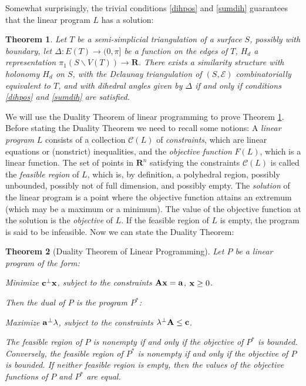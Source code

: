 \documentclass{acmart}
\newcommand{\thm}[2]{\begin{#1} #2 \end{#1}}
\newtheorem{theorem}{Theorem}[section]
\begin{document}
Somewhat surprisingly, the trivial conditions \ref{dihpos} and \ref{sumdih}
guarantees that the linear program $L$ has a solution:

\thm{theorem}
{
\label{mainthm}
Let $T$ be a semi-simplicial triangulation of a surface $S$, possibly
with boundary, let $\Delta:E(T)\rightarrow (0, \pi]$ be a function
on the edges of $T$, $H_d$ a representation $\pi_1 (S \backslash V(T))
\rightarrow \mathbf{R}$. There exists a similarity structure with
holonomy $H_d$ on $S$, with the Delaunay triangulation of $(S,
\mathcal{E})$ combinatorially equivalent to $T$, and with dihedral
angles given by $\Delta$ if and only if conditions \ref{dihpos} and
\ref{sumdih} are satisfied.
}

We will use the Duality Theorem of linear programming to prove Theorem
\ref{mainthm}. Before stating the Duality Theorem we need to recall
some notions: A \emph{linear program} $L$ consists of a collection
$\mathcal{C}(L)$ of \emph{constraints}, which are linear equations or
(nonstrict) inequalities, and the \emph{objective function} $F(L)$,
which is a linear function. The set of points in $\mathbf{R}^n$
satisfying the constraints $\mathcal{C}(L)$ is called the
\emph{feasible region} of $L$, which is, by definition, a polyhedral
region, possibly unbounded, possibly not of full dimension, and
possibly empty. The \emph{solution} of the linear program is a point
where the objective function attains an extremum (which may be a maximum or a
minimum). The value of the objective function at the solution is the
\emph{objective} of $L$. If the feasible region of $L$ is empty, the
program is said to be infeasible. Now we can state the Duality Theorem:


\begin{theorem}[Duality Theorem of Linear Programming]
\label{duality}
Let $P$ be a linear program of the form:

Minimize ${\bf c}^\perp {\bf x}$, subject to the constraints
${\bf A} {\bf x} = {\bf a}$, ${\bf x} \geq 0$.

Then the dual  of $P$ is the program $P^*$:

Maximize ${\bf a}^\perp {\bf \lambda}$, subject to the constraints
${\bf \lambda}^\perp {\bf A} \leq {\bf c}$.

The feasible region of $P$ is nonempty if and only if the 
objective of $P^*$ is bounded. Conversely, the feasible region
of $P^*$ is nonempty if and only if the objective of $P$ is bounded.
If neither feasible region is empty, then the values of the objective
functions of $P$ and $P^*$ are equal.
\end{theorem}
\end{document}
